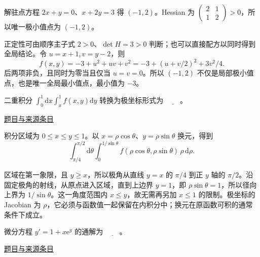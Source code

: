 \documentclass[UTF8,12pt,a4paper,fontset=fandol]{ctexart}
\begin{document}
\begin{solve}\label{ans:fin16-high:2}

解驻点方程 $2x+y=0$、$x+2y=3$ 得 $(-1,2)$。Hessian 为 $\begin{pmatrix}2&1\\1&2\end{pmatrix}>0$，所以唯一极小值点为 $\boxed{(-1,2)}$。

正定性可由顺序主子式 $2>0$、$\det H=3>0$ 判断；也可以直接配方以同时得到全局结论。令 $u=x+1,v=y-2$，则
\[
f(x,y)=-3+u^2+uv+v^2=-3+(u+v/2)^2+3v^2/4.
\]
后两项非负，且同时为零当且仅当 $u=v=0$。所以 $(-1,2)$ 不仅是局部极小值点，也是唯一全局最小值点，最小值为 $-3$。

\end{solve}

\begin{example}[来源序号3]\label{ex:fin16-high:3}\label{pr:fin16-high:3}

二重积分 $\int_0^1 \mathrm{d}x \int_x^1 f(x,y) \mathrm{d}y$ 转换为极坐标形式为 $\underline{\qquad}$。

\par\href{https://github.com/lzxcr/cmc-mathematics/blob/64916fa1fdbc3e444a652eca204d5669058ee321/src/problems/finals/16/03.md}{题目与来源条目}

\end{example}

\begin{solve}\label{ans:fin16-high:3}

积分区域为 $0\le x\le y\le1$。以 $x=\rho\cos\theta$、$y=\rho\sin\theta$ 换元，得到
\[
\boxed{\int_{\pi/4}^{\pi/2}\mathrm d\theta
\int_0^{1/\sin\theta}f(\rho\cos\theta,\rho\sin\theta)\,\rho\,\mathrm d\rho}.
\]

区域在第一象限，且 $y\ge x$，所以极角从直线 $y=x$ 的 $\pi/4$ 到正 $y$ 轴的 $\pi/2$。沿固定极角的射线，从原点进入区域，直到上边界 $y=1$，即 $\rho\sin\theta=1$，所以径向上界为 $1/\sin\theta$。这一角度范围内 $x\le y$，故无需再另加 $x\le1$ 的限制。极坐标的 Jacobian 为 $\rho$，它必须与函数值一起保留在内积分中；换元在原函数可积的通常条件下成立。

\end{solve}

\begin{example}[来源序号4]\label{ex:fin16-high:4}\label{pr:fin16-high:4}

微分方程 $y' = 1 + x \mathrm{e}^{y}$ 的通解为 $\underline{\qquad}$。

\par\href{https://github.com/lzxcr/cmc-mathematics/blob/64916fa1fdbc3e444a652eca204d5669058ee321/src/problems/finals/16/04.md}{题目与来源条目}

\end{example}
\end{document}
